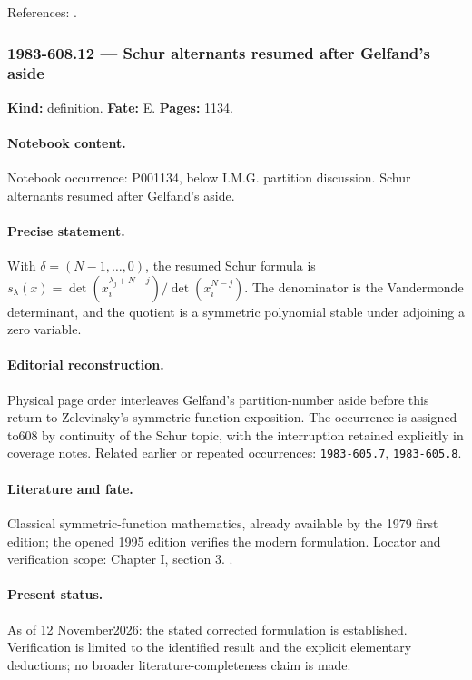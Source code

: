 \noindent References: \citep{macdonald1995symmetric}.\par

\subsubsection{1983-608.12 --- Schur alternants resumed after Gelfand's aside}

\label{item:1983-608.12}

\noindent\textbf{Kind:} definition. \textbf{Fate:} E. \textbf{Pages:} 1134.\par

\paragraph{Notebook content.} Notebook occurrence: P001134, below I.M.G. partition discussion. Schur alternants resumed after Gelfand's aside.

\paragraph{Precise statement.} With \(\delta=(N-1,\ldots,0)\), the resumed Schur formula is \(s_\lambda(x)=\det(x_i^{\lambda_j+N-j})/\det(x_i^{N-j})\). The denominator is the Vandermonde determinant, and the quotient is a symmetric polynomial stable under adjoining a zero variable.

\paragraph{Editorial reconstruction.} Physical page order interleaves Gelfand's partition-number aside before this return to Zelevinsky's symmetric-function exposition. The occurrence is assigned to608 by continuity of the Schur topic, with the interruption retained explicitly in coverage notes. Related earlier or repeated occurrences: \texttt{1983-605.7}, \texttt{1983-605.8}.

\paragraph{Literature and fate.} Classical symmetric-function mathematics, already available by the 1979 first edition; the opened 1995 edition verifies the modern formulation. Locator and verification scope: Chapter I, section 3. \cite{macdonald1995symmetric}.

\paragraph{Present status.} As of 12 November2026: the stated corrected formulation is established. Verification is limited to the identified result and the explicit elementary deductions; no broader literature-completeness claim is made.

